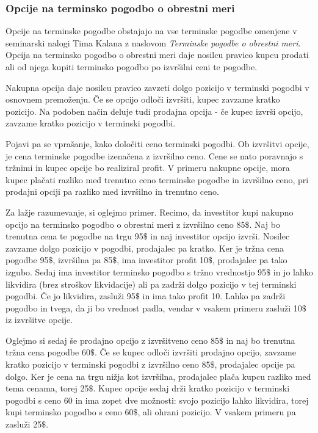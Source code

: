\documentclass[a4paper]{article}
\begin{document}
\subsubsection{Opcije na terminsko pogodbo o obrestni meri}
Opcije na terminske pogodbe obstajajo na vse terminske pogodbe omenjene v seminarski nalogi Tima Kalana z naslovom \textit{Terminske
pogodbe o obrestni meri}. Opcija na terminsko pogodbo o obrestni meri  daje nosilcu pravico
kupcu prodati ali od njega kupiti terminsko pogodbo po izvršilni ceni te pogodbe.

Nakupna opcija daje nosilcu pravico zavzeti dolgo pozicijo v terminski pogodbi v osnovnem premoženju. Če se opcijo odloči izvršiti,
kupec zavzame kratko pozicijo. Na podoben način deluje tudi prodajna opcija - če kupec izvrši opcijo, zavzame kratko pozicijo v terminski
pogodbi. 

Pojavi pa se vprašanje, kako določiti ceno terminski pogodbi. Ob izvršitvi opcije, je cena terminske pogodbe izenačena z izvršilno ceno.
Cene se nato poravnajo s tržnimi in kupec opcije bo realiziral profit. V primeru nakupne opcije, mora kupec plačati razliko med trenutno
ceno terminske pogodbe in izvršilno ceno, pri prodajni opciji pa razliko med izvršilno in trenutno ceno.

Za lažje razumevanje, si oglejmo primer. Recimo, da investitor kupi nakupno opcijo na terminsko pogodbo o obrestni meri z izvršilno ceno
85$\$$. Naj bo trenutna cena te pogodbe na trgu 95$\$$ in naj investitor opcijo izvrši. Nosilec zavzame dolgo pozicijo v pogodbi, prodajalec
pa kratko. Ker je tržna cena pogodbe 95$\$$, izvršilna pa 85$\$$, ima investitor profit 10$\$$, prodajalec pa tako izgubo. Sedaj ima
investitor terminsko pogodbo s tržno vrednostjo 95$\$$ in jo lahko likvidira (brez stroškov likvidacije) ali pa zadrži dolgo pozicijo v
tej terminski pogodbi. Če jo likvidira, zasluži 95$\$$ in ima tako profit 10. Lahko pa zadrži pogodbo in tvega, da ji bo vrednost padla,
vendar v vsakem primeru zasluži 10$\$$ iz izvršitve opcije.

Oglejmo si sedaj še prodajno opcijo z izvršitveno ceno 85$\$$ in naj bo trenutna tržna cena pogodbe 60$\$$. Če se kupec odloči
izvršiti prodajno opcijo, zavzame kratko pozicijo v terminski pogodbi z izvršilno ceno 85$\$$, prodajalec opcije pa dolgo. Ker je cena
na trgu nižja kot izvršilna, prodajalec plača kupcu razliko med tema cenama, torej 25$\$$. Kupec opcije sedaj drži kratko pozicijo
v terminski pogodbi s ceno 60 in ima zopet dve možnosti: svojo pozicijo lahko likvidira, torej kupi terminsko pogodbo s ceno 60$\$$, ali
ohrani pozicijo. V vsakem primeru pa zasluži 25$\$$.
\end{document}
